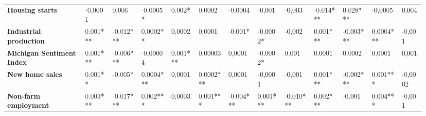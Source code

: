 \begin{landscape}
\begin{table}[]
{\begin{tabular}{@{}lllllllllllll@{}}
\textbf{Housing starts}           & -0,0001                               & 0,006                                 & -0.0005*                              & 0.002*                                & 0,0002                                & -0,0004                               & -0,001                                & -0,003                                & -0.014***                             & 0.028***                              & -0,0005                               & 0,004                                 \\
\textbf{Industrial production}    & 0.001***                              & -0.012***                             & 0.0002**                              & 0,0002                                & 0,0001                                & -0.001*                               & -0.0002*                              & -0,002                                & 0.001***                              & -0.003***                             & 0.0004***                             & -0,001                                \\
\textbf{Michigan Sentiment Index} & 0.001***                              & -0.006***                             & -0,00004                              & 0.001***                              & 0,00003                               & 0,0001                                & -0.0002*                              & 0,001                                 & 0.0001                                & 0.0002                                & 0,0001                                & 0,001                                 \\
\textbf{New home sales}           & 0.001**                               & -0.005*                               & 0.0004***                             & 0,0001                                & 0.0002***                             & 0,0001                                & -0,0001                               & -0,001                                & 0.001***                              & -0.002***                             & 0.001***                              & -0,0002                               \\
\textbf{Non-farm employment}      & 0.003***                              & -0.017***                             & 0.002***                              & 0,0003                                & 0.001***                              & -0.004***                             & 0.001***                              & -0.010***                             & 0.002***                              & -0.001                                & 0.004***                              & -0,001                                \\

\end{tabular}}
\end{table}
\end{landscape}
